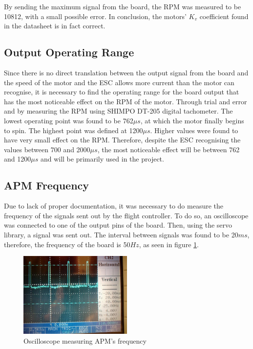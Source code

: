 By sending the maximum signal from the board, the RPM was measured to be 10812, with a small possible error.
In conclusion, the motors' $K_v$ coefficient found in the datasheet is in fact correct.

\subsection{Output Operating Range}

Since there is no direct translation between the output signal from the board and the speed of the motor and the ESC allows more current than the motor can recognise, it is necessary to find the operating range for the board output that has the most noticeable effect on the RPM of the motor. Through trial and error and by measuring the RPM using SHIMPO DT-205 digital tachometer. The lowest operating point was found to be 762$\mu s$, at which the motor finally begins to spin. The highest point was defined at 1200$\mu s$. Higher values were found to have very small effect on the RPM.
Therefore, despite the ESC recognising the values between 700 and 2000$\mu s$, the most noticeable effect will be between 762 and 1200$\mu s$ and will be primarily used in the project.

\subsection{APM Frequency}
Due to lack of proper documentation, it was necessary to do measure the frequency of the signals sent out by the flight controller. To do so, an oscilloscope was connected to one of the output pins of the board. Then, using the servo library, a signal was sent out. The interval between signals was found to be 20$ms$, therefore, the frequency of the board is 50$Hz$, as seen in figure \ref{oscillo1}.
\begin{figure}[H]
  \centering
    \includegraphics[width=0.5\textwidth]{images/oscillo1.jpg}
	\caption{Oscilloscope measuring APM's frequency}
	\label{oscillo1}
\end{figure}

